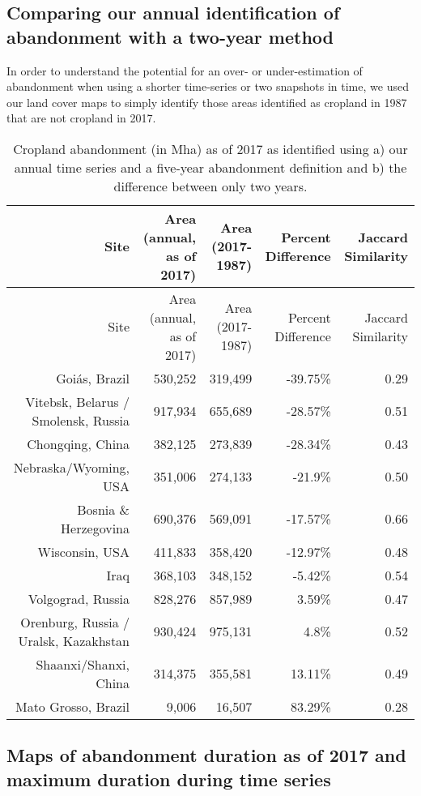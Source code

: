 \documentclass[9pt,twocolumn,twoside,]{pnas-new}
\begin{document}
\hypertarget{twoyr-vs-annual}{%
\subsection{Comparing our annual identification of abandonment with a two-year method}\label{twoyr-vs-annual}}

In order to understand the potential for an over- or under-estimation of abandonment when using a shorter time-series or two snapshots in time, we used our land cover maps to simply identify those areas identified as cropland in 1987 that are not cropland in 2017.

\newpage

\begin{longtable}[]{@{}rrrrr@{}}
\caption{\label{tab:twoyr-diff-table}Cropland abandonment (in Mha) as of 2017 as identified using a) our annual time series and a five-year abandonment definition and b) the difference between only two years.}\tabularnewline
\toprule
Site & Area (annual, as of 2017) & Area (2017-1987) & Percent Difference & Jaccard Similarity \\
\midrule
\endfirsthead
\toprule
Site & Area (annual, as of 2017) & Area (2017-1987) & Percent Difference & Jaccard Similarity \\
\midrule
\endhead
Goiás, Brazil & 530,252 & 319,499 & -39.75\% & 0.29 \\
Vitebsk, Belarus / Smolensk, Russia & 917,934 & 655,689 & -28.57\% & 0.51 \\
Chongqing, China & 382,125 & 273,839 & -28.34\% & 0.43 \\
Nebraska/Wyoming, USA & 351,006 & 274,133 & -21.9\% & 0.50 \\
Bosnia \& Herzegovina & 690,376 & 569,091 & -17.57\% & 0.66 \\
Wisconsin, USA & 411,833 & 358,420 & -12.97\% & 0.48 \\
Iraq & 368,103 & 348,152 & -5.42\% & 0.54 \\
Volgograd, Russia & 828,276 & 857,989 & 3.59\% & 0.47 \\
Orenburg, Russia / Uralsk, Kazakhstan & 930,424 & 975,131 & 4.8\% & 0.52 \\
Shaanxi/Shanxi, China & 314,375 & 355,581 & 13.11\% & 0.49 \\
Mato Grosso, Brazil & 9,006 & 16,507 & 83.29\% & 0.28 \\
\bottomrule
\end{longtable}

\newpage

\hypertarget{maps-of-abandonment-duration-as-of-2017-and-maximum-duration-during-time-series}{%
\subsection{Maps of abandonment duration as of 2017 and maximum duration during time series}\label{maps-of-abandonment-duration-as-of-2017-and-maximum-duration-during-time-series}}
\end{document}
